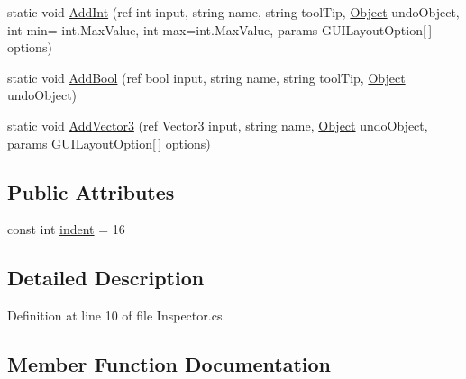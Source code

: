 \begin{DoxyCompactItemize}
\item 
static void \mbox{\hyperlink{class_root_motion_1_1_inspector_af43d0270035b8725fdddd30252c9cc86}{Add\+Int}} (ref int input, string name, string tool\+Tip, \mbox{\hyperlink{_quads_8cs_aef19bab18b9814edeef255c43e4f6bbc}{Object}} undo\+Object, int min=-\/int.\+Max\+Value, int max=int.\+Max\+Value, params G\+U\+I\+Layout\+Option\mbox{[}$\,$\mbox{]} options)
\item 
static void \mbox{\hyperlink{class_root_motion_1_1_inspector_aefa27a7b1823b0db16208072d3d10789}{Add\+Bool}} (ref bool input, string name, string tool\+Tip, \mbox{\hyperlink{_quads_8cs_aef19bab18b9814edeef255c43e4f6bbc}{Object}} undo\+Object)
\item 
static void \mbox{\hyperlink{class_root_motion_1_1_inspector_a3f84ec4eb58f18783745ecc0c721b559}{Add\+Vector3}} (ref Vector3 input, string name, \mbox{\hyperlink{_quads_8cs_aef19bab18b9814edeef255c43e4f6bbc}{Object}} undo\+Object, params G\+U\+I\+Layout\+Option\mbox{[}$\,$\mbox{]} options)
\end{DoxyCompactItemize}
\subsection*{Public Attributes}
\begin{DoxyCompactItemize}
\item 
const int \mbox{\hyperlink{class_root_motion_1_1_inspector_ad19edde302fe0d0cf0d6b4cc9d9cfc28}{indent}} = 16
\end{DoxyCompactItemize}


\subsection{Detailed Description}


Definition at line 10 of file Inspector.\+cs.



\subsection{Member Function Documentation}
\mbox{\label{class_root_motion_1_1_inspector_abce58e13dd0ef29c1b0cf84b5332bd3c}} 
